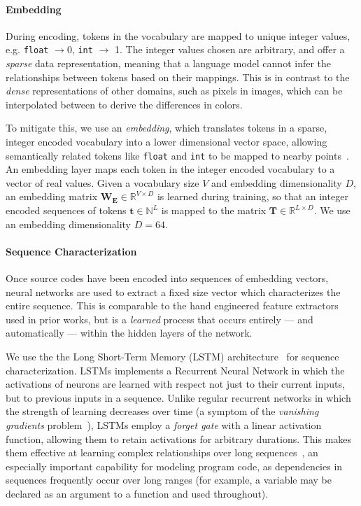 

\paragraph{Embedding} During encoding, tokens in the vocabulary are mapped to unique integer values, e.g. \texttt{float} $\rightarrow 0$, \texttt{int} $\rightarrow$ 1. The integer values chosen are arbitrary, and offer a \emph{sparse} data representation, meaning that a language model cannot infer the relationships between tokens based on their mappings. This is in contrast to the \emph{dense} representations of other domains, such as pixels in images, which can be interpolated between to derive the differences in colors.

To mitigate this, we use an \emph{embedding}, which translates tokens in a sparse, integer encoded vocabulary into a lower dimensional vector space, allowing semantically related tokens like \texttt{float} and \texttt{int} to be mapped to nearby points~\cite{Mikolov2013a,Baroni2014}. An embedding layer maps each token in the integer encoded vocabulary to a vector of real values. Given a vocabulary size $V$ and embedding dimensionality $D$, an embedding matrix $\bm{W_{E}} \in \mathbb{R}^{V \times D}$ is learned during training, so that an integer encoded sequences of tokens $\bm{t} \in \mathbb{N}^{L}$ is mapped to the matrix $\bm{T} \in \mathbb{R}^{L \times D}$. We use an embedding dimensionality $D = 64$.

\paragraph{Sequence Characterization} Once source codes have been encoded into sequences of embedding vectors, neural networks are used to extract a fixed size vector which characterizes the entire sequence. This is comparable to the hand engineered feature extractors used in prior works, but is a \emph{learned} process that occurs entirely --- and automatically --- within the hidden layers of the network.

We use the the Long Short-Term Memory (LSTM) architecture~\cite{Hochreiter1997} for sequence characterization. LSTMs implements a Recurrent Neural Network in which the activations of neurons are learned with respect not just to their current inputs, but to previous inputs in a sequence. Unlike regular recurrent networks in which the strength of learning decreases over time (a symptom of the \emph{vanishing gradients} problem~\cite{Pacanu2013}), LSTMs employ a \emph{forget gate} with a linear activation function, allowing them to retain activations for arbitrary durations. This makes them effective at learning complex relationships over long sequences~\cite{Lipton2015}, an especially important capability for modeling program code, as dependencies in sequences frequently occur over long ranges (for example, a variable may be declared as an argument to a function and used throughout).

